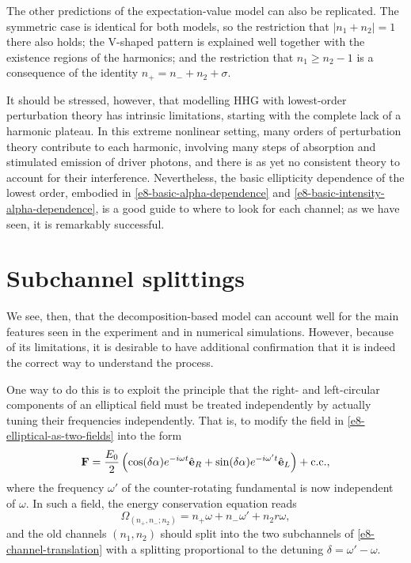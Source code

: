 The other predictions of the expectation-value model can also be replicated. The symmetric case is identical for both models, so the restriction that $|n_1+n_2|=1$ there also holds; the V-shaped pattern is explained well together with the existence regions of the harmonics; and the restriction that $n_1\geq n_2-1$ is a consequence of the identity $n_+=n_- + n_2 + \sigma$.

It should be stressed, however, that modelling HHG with lowest-order perturbation theory has intrinsic limitations, starting with the complete lack of a harmonic plateau. In this extreme nonlinear setting, many orders of perturbation theory contribute to each harmonic, involving many steps of absorption and stimulated emission of driver photons, and there is as yet no consistent theory to account for their interference. Nevertheless, the basic ellipticity dependence of the lowest order, embodied in \eqref{e8-basic-alpha-dependence} and \eqref{e8-basic-intensity-alpha-dependence}, is a good guide to where to look for each channel; as we have seen, it is remarkably successful.














\section{Subchannel splittings}
\label{sec:subchannel-splittings}
We see, then, that the decomposition-based model can account well for the main features seen in the experiment and in numerical simulations. However, because of its limitations, it is desirable to have additional confirmation that it is indeed the correct way to understand the process.

One way to do this is to exploit the principle that the right- and left-circular components of an elliptical field must be treated independently by actually tuning their frequencies independently. That is, to modify the field in \eqref{e8-elliptical-as-two-fields} into the form
\begin{equation}
 \vb{F}=
 \frac{E_0}{2}
 \left(
 \cos(\delta\alpha)e^{-i\omega t}\hat{\vb{e}}_R
 +
  \sin(\delta\alpha)e^{-i\omega' t}\hat{\vb{e}}_L
 \right)
 +\mathrm{c.c.},
 \label{e8-detuned-elliptical-field}
\end{equation}
where the frequency $\omega'$ of the counter-rotating fundamental is now independent of $\omega$. In such a field, the energy conservation equation reads
\begin{equation}
 \Omega_{(n_+,n_-;n_2)}=n_+\omega + n_-\omega'+n_2r\omega,
 \label{e8-modified-energy-conservation}
\end{equation}
and the old channels $(n_1,n_2)$ should split into the two subchannels of \eqref{e8-channel-translation} with a splitting proportional to the detuning $\delta=\omega'-\omega$.




